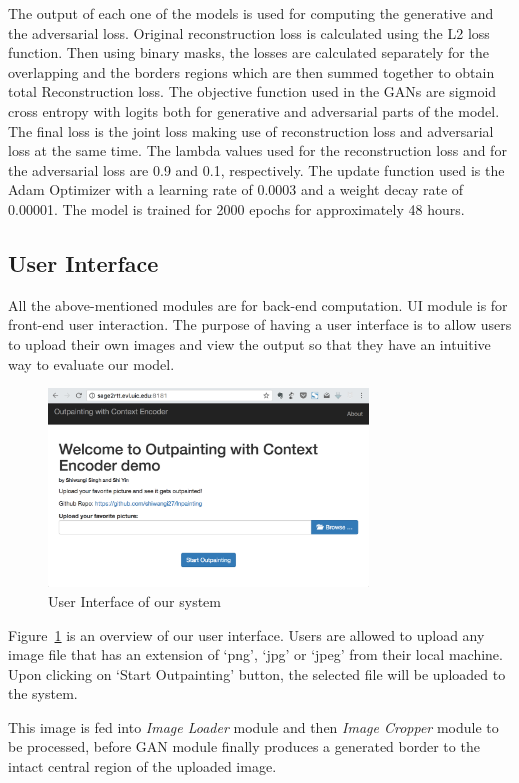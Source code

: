 \documentclass{sig-alternate}
\begin{document}
The output of each one of the models is used for computing the generative and the adversarial loss. Original reconstruction loss is calculated using the L2 loss function. Then using binary masks, the losses are calculated separately for the overlapping and the borders regions which are then summed together to obtain total Reconstruction loss. The objective function used in the GANs are sigmoid cross entropy with logits both for generative and adversarial parts of the model. The final loss is the joint loss making use of reconstruction loss and adversarial loss at the same time. The lambda values used for the reconstruction loss and for the adversarial loss are 0.9 and 0.1, respectively. The update function used is the Adam Optimizer with a learning rate of 0.0003 and a weight decay rate of 0.00001. The model is trained for 2000 epochs for approximately 48 hours.


\subsection{User Interface}
All the above-mentioned modules are for back-end computation. UI module is for front-end user interaction. The purpose of having a user interface is to allow users to upload their own images and view the output so that they have an intuitive way to evaluate our model.

\begin{figure}[htb]
	\centering
	\includegraphics[width=8.5cm]{ui}
	\caption{User Interface of our system}
	\label{fig:ui}
\end{figure}

Figure~\ref{fig:ui} is an overview of our user interface. Users are allowed to upload any image file that has an extension of `png', `jpg' or `jpeg' from their local machine. Upon clicking on `Start Outpainting' button, the selected file will be uploaded to the system.

This image is fed into \textit{Image Loader} module and then \textit{Image Cropper} module to be processed, before GAN module finally produces a generated border to the intact central region of the uploaded image.
\end{document}

